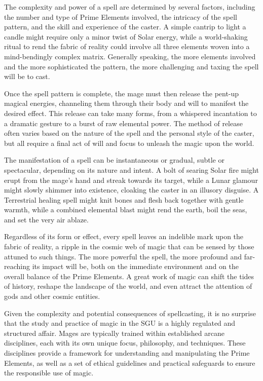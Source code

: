 \documentclass[12pt]{article}
\begin{document}
The complexity and power of a spell are determined by several factors, including the number and type of Prime Elements involved, the intricacy of the spell pattern, and the skill and experience of the caster. A simple cantrip to light a candle might require only a minor twist of Solar energy, while a world-shaking ritual to rend the fabric of reality could involve all three elements woven into a mind-bendingly complex matrix. Generally speaking, the more elements involved and the more sophisticated the pattern, the more challenging and taxing the spell will be to cast.

Once the spell pattern is complete, the mage must then release the pent-up magical energies, channeling them through their body and will to manifest the desired effect. This release can take many forms, from a whispered incantation to a dramatic gesture to a burst of raw elemental power. The method of release often varies based on the nature of the spell and the personal style of the caster, but all require a final act of will and focus to unleash the magic upon the world.

The manifestation of a spell can be instantaneous or gradual, subtle or spectacular, depending on its nature and intent. A bolt of searing Solar fire might erupt from the mage's hand and streak towards its target, while a Lunar glamour might slowly shimmer into existence, cloaking the caster in an illusory disguise. A Terrestrial healing spell might knit bones and flesh back together with gentle warmth, while a combined elemental blast might rend the earth, boil the seas, and set the very air ablaze.

Regardless of its form or effect, every spell leaves an indelible mark upon the fabric of reality, a ripple in the cosmic web of magic that can be sensed by those attuned to such things. The more powerful the spell, the more profound and far-reaching its impact will be, both on the immediate environment and on the overall balance of the Prime Elements. A great work of magic can shift the tides of history, reshape the landscape of the world, and even attract the attention of gods and other cosmic entities.

Given the complexity and potential consequences of spellcasting, it is no surprise that the study and practice of magic in the SGU is a highly regulated and structured affair. Mages are typically trained within established arcane disciplines, each with its own unique focus, philosophy, and techniques. These disciplines provide a framework for understanding and manipulating the Prime Elements, as well as a set of ethical guidelines and practical safeguards to ensure the responsible use of magic.
\end{document}

